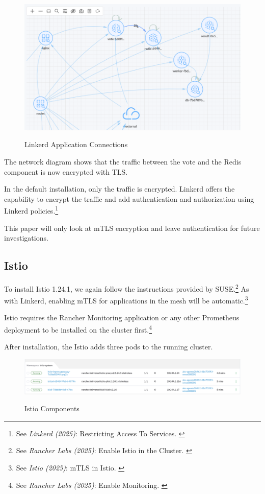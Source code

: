 \begin{figure}[H]
\centering
\caption {Linkerd Application Connections}
\includegraphics[width=\linewidth]{images/linkerd-map.png}
\label{fig:linkerdMap}
\end{figure}

The network diagram shows that the traffic between the vote and the Redis component is now encrypted with TLS.

In the default installation, only the traffic is encrypted. Linkerd offers the capability to encrypt the traffic and add authentication and authorization using Linkerd policies.\footnote{See \textit{Linkerd (2025)}: Restricting Access To Services. \cite{restrictingAccess}}

This paper will only look at mTLS encryption and leave authentication for future investigations.

\subsection{Istio}

To install Istio 1.24.1, we again follow the instructions provided by SUSE.\footnote{See \textit{Rancher Labs (2025)}: Enable Istio in the Cluster. \cite{enableIstio}} As with Linkerd, enabling mTLS for applications in the mesh will be automatic.\footnote{See \textit{Istio (2025)}: mTLS in Istio. \cite{istioMtls}} 

Istio requires the Rancher Monitoring application or any other Prometheus deployment to be installed on the cluster first.\footnote{See \textit{Rancher Labs (2025)}: Enable Monitoring. \cite{enableMonitoring}}

After installation, the Istio adds three pods to the running cluster.

\begin{figure}[H]
\centering
\caption {Istio Components}
\includegraphics[width=\linewidth]{images/istio-pods.png}
\label{fig:istioPods}
\end{figure}

